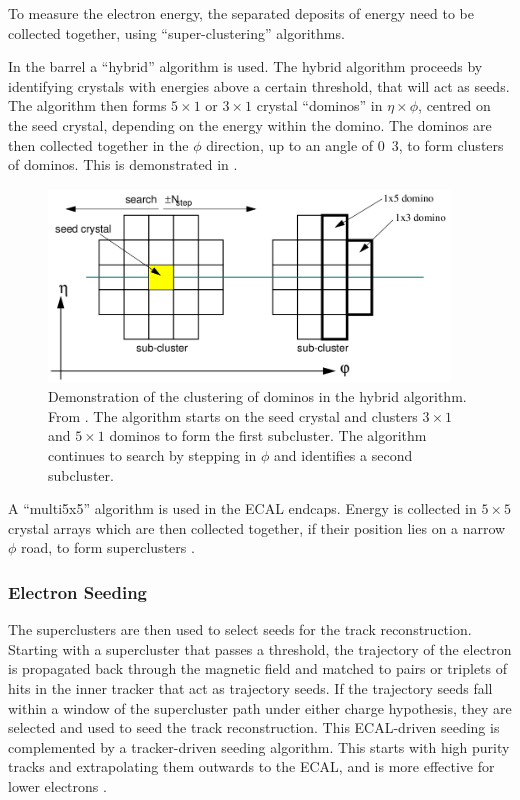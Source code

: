 To measure the electron energy, the separated deposits of energy need to be
collected together, using ``super-clustering'' algorithms. 

In the barrel a ``hybrid'' algorithm is used. The hybrid algorithm proceeds by
identifying crystals with energies above a certain threshold, that will act as
seeds. The algorithm then forms $5\times1$ or $3\times1$ crystal ``dominos'' in
$\eta\times\phi$, centred on the seed crystal, depending on the
energy within the domino. The dominos are then collected together in the $\phi$
direction, up to an angle of \unit{0.3}{\rad}, to form clusters of dominos.
This is demonstrated in  \cite{meschi2001electron}.

\begin{figure}[htbp]
  \centering
  \includegraphics[width=0.95\textwidth]{hybridalgo}
  \caption{Demonstration of the clustering of dominos in the hybrid algorithm.
From \cite{meschi2001electron}. The algorithm starts on the seed crystal and clusters
$3\times1$ and $5\times1$ dominos to form the first subcluster. The algorithm continues to search
by stepping in $\phi$ and identifies a second subcluster.}
  \label{fig:hybrid}
\end{figure}

A ``multi5x5'' algorithm is used in the ECAL endcaps. Energy is collected in
$5\times5$ crystal arrays which are then collected together, if their position lies on
a narrow $\phi$ road, to form superclusters \cite{meschi2001electron}.

\subsubsection{Electron Seeding}
The superclusters are then used to select seeds for the track reconstruction.
Starting with a supercluster that passes a \pt threshold,
the trajectory of the electron is propagated back through the magnetic field and
matched to pairs or triplets of hits in the inner tracker that act as trajectory
seeds.  If the trajectory seeds fall within a window of the supercluster path
under either charge hypothesis, they are selected and used to seed the track
reconstruction.  This ECAL-driven seeding is complemented by a tracker-driven
seeding algorithm.  This starts with high purity tracks and extrapolating them
outwards to the ECAL, and is more effective for lower \pt electrons
\cite{baffioni2007electron,adam2009electron}.

